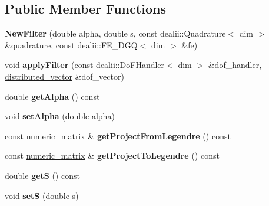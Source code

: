 \subsection*{Public Member Functions}
\begin{DoxyCompactItemize}
\item 
\hypertarget{classnatrium_1_1NewFilter_a4762826b58acf9b1770733aa0cc18cdc}{
{\bfseries NewFilter} (double alpha, double s, const dealii::Quadrature$<$ dim $>$ \&quadrature, const dealii::FE\_\-DGQ$<$ dim $>$ \&fe)}
\label{classnatrium_1_1NewFilter_a4762826b58acf9b1770733aa0cc18cdc}

\item 
\hypertarget{classnatrium_1_1NewFilter_ae5c15cce51ac8c2e5669c97c03f40a8f}{
void {\bfseries applyFilter} (const dealii::DoFHandler$<$ dim $>$ \&dof\_\-handler, \hyperlink{namespacenatrium_a903d2b92917f582f2ff05f52160ab811}{distributed\_\-vector} \&dof\_\-vector)}
\label{classnatrium_1_1NewFilter_ae5c15cce51ac8c2e5669c97c03f40a8f}

\item 
\hypertarget{classnatrium_1_1NewFilter_ad7c478d6f6eb91c68dbd65a15f75a9be}{
double {\bfseries getAlpha} () const }
\label{classnatrium_1_1NewFilter_ad7c478d6f6eb91c68dbd65a15f75a9be}

\item 
\hypertarget{classnatrium_1_1NewFilter_a99e40481e0a1846982dfbbf755855af8}{
void {\bfseries setAlpha} (double alpha)}
\label{classnatrium_1_1NewFilter_a99e40481e0a1846982dfbbf755855af8}

\item 
\hypertarget{classnatrium_1_1NewFilter_ac41f9e04b6e8510bba2a500ecb32324e}{
const \hyperlink{namespacenatrium_ad8cbec7aab93a74837b06ded39615d47}{numeric\_\-matrix} \& {\bfseries getProjectFromLegendre} () const }
\label{classnatrium_1_1NewFilter_ac41f9e04b6e8510bba2a500ecb32324e}

\item 
\hypertarget{classnatrium_1_1NewFilter_a412d1f58c4317384d847a7d2915853ab}{
const \hyperlink{namespacenatrium_ad8cbec7aab93a74837b06ded39615d47}{numeric\_\-matrix} \& {\bfseries getProjectToLegendre} () const }
\label{classnatrium_1_1NewFilter_a412d1f58c4317384d847a7d2915853ab}

\item 
\hypertarget{classnatrium_1_1NewFilter_aba20fadc302c80b8f019dc21528b9b5b}{
double {\bfseries getS} () const }
\label{classnatrium_1_1NewFilter_aba20fadc302c80b8f019dc21528b9b5b}

\item 
\hypertarget{classnatrium_1_1NewFilter_a7806f03494544d011d60788de497db2f}{
void {\bfseries setS} (double s)}
\label{classnatrium_1_1NewFilter_a7806f03494544d011d60788de497db2f}


\end{DoxyCompactItemize}
